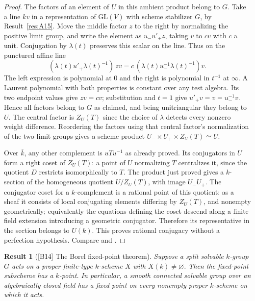 \documentclass[11pt,a4paper,openany,oneside]{book}
\theoremstyle{resultstyle}
\newtheorem{statement}{Result}[chapter]
\newenvironment{result}[2]{\clubpenalty=10000\begin{statement}[\textnormal{[#1]} #2]\leavevmode\label{res:#1}\ignorespaces}{\end{statement}}
\theoremstyle{definition}
\numberwithin{equation}{chapter}
\newcommand{\GL}{\mathrm{GL}}
\begin{document}
\begin{proof}
The factors of an element of \(U\) in this ambient product
belong to \(G\). Take a line \(kv\) in a representation
of \(\GL(V)\) with scheme stabilizer \(G\), by
Result~\ref{res:A15}. Move the middle factor \(z\) to the
right by normalizing the positive limit group, and write the
element as \(u_-u'_+z\), taking \(v\) to \(cv\) with \(c\)
a unit. Conjugation by \(\lambda(t)\) preserves this scalar
on the line. Thus on the punctured affine line
\[
 (\lambda(t)u'_+\lambda(t)^{-1})\,zv
   =c\,(\lambda(t)u_-^{-1}\lambda(t)^{-1})v .
\]
The left expression is polynomial at \(0\) and the right
is polynomial in \(t^{-1}\) at \(\infty\). A Laurent
polynomial with both properties is constant over any test
algebra. Its two endpoint values give \(zv=cv\);
substitution and \(t=1\) give \(u'_+v=v=u_-^{-1}v\).
Hence all factors belong to \(G\) as claimed, and being
unitriangular they belong to \(U\).
The central factor is \(Z_U(T)\) since the choice of
\(\lambda\) detects every nonzero weight difference.
Reordering the factors using that central factor's
normalization of the two limit groups gives a scheme
product \(U_-\times U_+\times Z_U(T)\simeq U\).

Over \(\bar k\), any other complement is \(uTu^{-1}\)
as already proved. Its conjugators in \(U\) form a right
coset of \(Z_U(T)\): a point of \(U\) normalizing \(T\)
centralizes it, since the quotient \(D\) restricts
isomorphically to \(T\). The product just proved gives a
\(k\)-section of the homogeneous quotient \(U/Z_U(T)\),
with image \(U_-U_+\).
The conjugator coset for a \(k\)-complement is a rational
point of this quotient: as a sheaf it consists of local
conjugating elements differing by \(Z_U(T)\), and nonempty
geometrically; equivalently the equations defining the
coset descend along a finite field extension introducing a
geometric conjugator. Therefore its representative in the
section belongs to \(U(k)\). This proves rational
conjugacy without a perfection hypothesis.
Compare \cite[Proposition 16.54]{milne} and
\cite[Appendix A.2]{conradfeng}.
\end{proof}

\begin{result}{B14}{The Borel fixed-point theorem}
Suppose a split solvable \(k\)-group \(G\) acts on a proper
finite-type \(k\)-scheme \(X\) with \(X(k)\ne\varnothing\).
Then the fixed-point subscheme has a \(k\)-point. In particular,
a smooth connected solvable group over an algebraically closed
field has a fixed point on every nonempty proper \(k\)-scheme
on which it acts.
\end{result}
\end{document}

